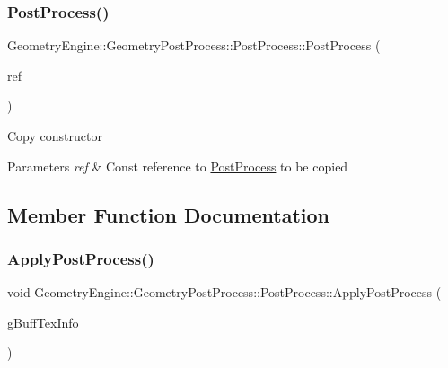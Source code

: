 \subsubsection{\texorpdfstring{PostProcess()}{PostProcess()}\hspace{0.1cm}{\footnotesize\ttfamily [2/2]}}
{\footnotesize\ttfamily Geometry\+Engine\+::\+Geometry\+Post\+Process\+::\+Post\+Process\+::\+Post\+Process (\begin{DoxyParamCaption}\item[{const \mbox{\hyperlink{class_geometry_engine_1_1_geometry_post_process_1_1_post_process}{Post\+Process}} \&}]{ref }\end{DoxyParamCaption})}

Copy constructor 
\begin{DoxyParams}{Parameters}
{\em ref} & Const reference to \mbox{\hyperlink{class_geometry_engine_1_1_geometry_post_process_1_1_post_process}{Post\+Process}} to be copied \\
\hline
\end{DoxyParams}


\subsection{Member Function Documentation}
\mbox{\label{class_geometry_engine_1_1_geometry_post_process_1_1_post_process_a2dbb157265ebdeea658982673e757d46}} 
\subsubsection{\texorpdfstring{ApplyPostProcess()}{ApplyPostProcess()}}
{\footnotesize\ttfamily void Geometry\+Engine\+::\+Geometry\+Post\+Process\+::\+Post\+Process\+::\+Apply\+Post\+Process (\begin{DoxyParamCaption}\item[{const \mbox{\hyperlink{class_geometry_engine_1_1_g_buffer_texture_info}{G\+Buffer\+Texture\+Info}} \&}]{g\+Buff\+Tex\+Info }\end{DoxyParamCaption})\hspace{0.3cm}{\ttfamily [virtual]}}

